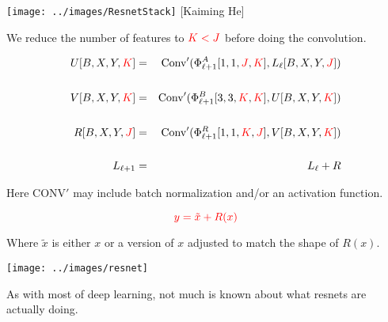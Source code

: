 {

\centerline{\texttt{[image: ../images/ResnetStack]} {\large [Kaiming He]}}


We reduce the number of features to ${\color{red} K < J}$ before doing the convolution.

{\huge
\begin{eqnarray*}
U[B,X,Y,{\color{red} K}] & = & \mathrm{Conv}'(\Phi^A_{\ell+1}{ [1,1,{\color{red} J},{\color{red} K}]},L_\ell[B,X,Y,{\color{red} J}]) \\
\\
V[B,X,Y,{\color{red} K}] & = & \mathrm{Conv}'(\Phi^B_{\ell+1}{[3,3,{\color{red} K},{\color{red} K}]},U[B,X,Y,{\color{red} K}]) \\
\\
R[B,X,Y,{\color{red} J}] & = & \mathrm{Conv}'(\Phi^R_{\ell+1}{ [1,1,{\color{red} K},{\color{red} J}]},V[B,X,Y,{\color{red} K}]) \\
\\
L_{ \ell+1} & = & L_\ell + R
\end{eqnarray*}
}

\vfill
Here $\mathrm{CONV}'$ may include batch normalization and/or an activation function.


$${\color{red} y = \tilde{x} + R(x)}$$

\vfill
Where $\tilde{x}$ is either $x$ or a version of $x$ adjusted to match the shape of $R(x)$.



\vfill
\texttt{[image: ../images/resnet]}
\hfill \begin{minipage}[b]{4in} As with most of deep learning, not much is known about what resnets are actually doing.
  

\end{minipage}}
